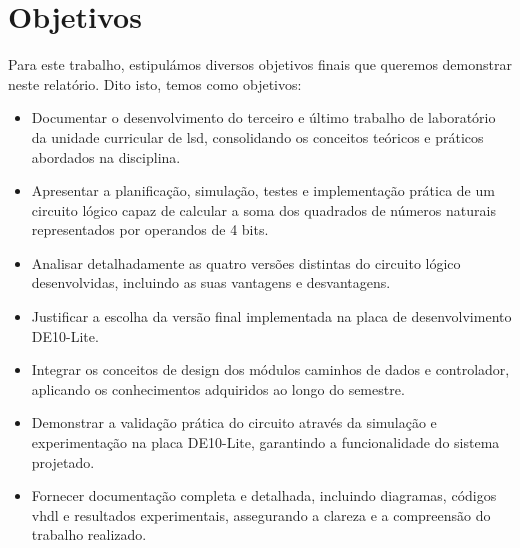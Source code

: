 \section{Objetivos}

Para este trabalho, estipulámos diversos objetivos finais que queremos demonstrar 
neste relatório. Dito isto, temos como objetivos:

\begin{itemize}
    \item Documentar o desenvolvimento do terceiro e último trabalho de laboratório
        da unidade curricular de \gls{lsd}, consolidando os conceitos teóricos
        e práticos abordados na disciplina.

    \item Apresentar a planificação, simulação, testes e implementação prática de
        um circuito lógico capaz de calcular a soma dos quadrados de números naturais
        representados por operandos de 4 bits.

    \item Analisar detalhadamente as quatro versões distintas do circuito lógico
        desenvolvidas, incluindo as suas vantagens e desvantagens.

    \item Justificar a escolha da versão final implementada na placa de desenvolvimento
        DE10-Lite.

    \item Integrar os conceitos de design dos módulos caminhos de dados e controlador,
        aplicando os conhecimentos adquiridos ao longo do semestre.

    \item Demonstrar a validação prática do circuito através da simulação e experimentação
        na placa DE10-Lite, garantindo a funcionalidade do sistema projetado.

    \item Fornecer documentação completa e detalhada, incluindo diagramas, códigos
        \gls{vhdl} e resultados experimentais, assegurando a clareza e a compreensão
        do trabalho realizado.
\end{itemize}